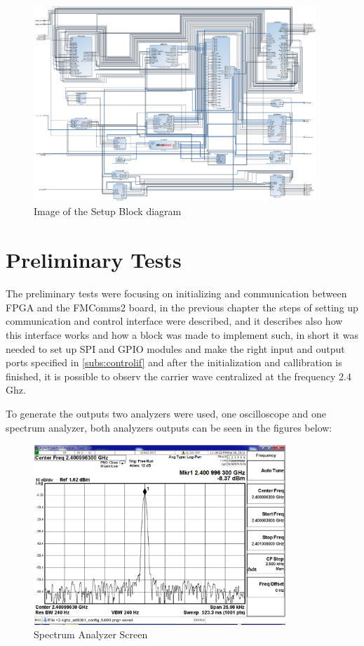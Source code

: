 \begin{figure}[htbp]
    \centering
    \includegraphics[width=0.95\textwidth]{./figures/setup_bd}
    \caption{ Image of the Setup Block diagram
    \label{fig:setupbd}}
\end{figure}

\vfill
\clearpage

\section{Preliminary Tests}
\label{result:conf}

The preliminary tests were focusing on initializing and communication between FPGA
and the FMComms2 board, in the previous chapter the steps of setting up communication
and control interface were described, and it describes also how this interface works
and how a block was made to implement such, in short it was needed to set up SPI and GPIO
modules and make the right input and output ports specified in \ref{subs:controlif} and
after the initialization and callibration is finished, it is possible to observ the
carrier wave centralized at the frequency 2.4 Ghz.

To generate the outputs two analyzers were used, one oscilloscope and one spectrum analyzer,
both analyzers outputs can be seen in the figures below:

\begin{figure}[htbp]
    \centering
    \includegraphics[width=0.85\textwidth]{./figures/spectrum_init}
    \caption{ Spectrum Analyzer Screen
    \label{fig:spec}}
\end{figure}

